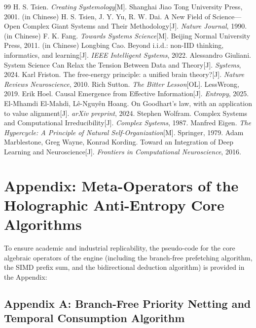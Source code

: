 \documentclass[11pt,a4paper]{article}
\begin{document}
\newpage

\begin{thebibliography}{99}
 H. S. Tsien. \emph{Creating Systemology}[M]. Shanghai Jiao Tong University Press, 2001. (in Chinese)
 H. S. Tsien, J. Y. Yu, R. W. Dai. A New Field of Science—Open Complex Giant Systems and Their Methodology[J]. \emph{Nature Journal}, 1990. (in Chinese)
 F. K. Fang. \emph{Towards Systems Science}[M]. Beijing Normal University Press, 2011. (in Chinese)
 Longbing Cao. Beyond i.i.d.: non-IID thinking, informatics, and learning[J]. \emph{IEEE Intelligent Systems}, 2022.
 Alessandro Giuliani. System Science Can Relax the Tension Between Data and Theory[J]. \emph{Systems}, 2024.
 Karl Friston. The free-energy principle: a unified brain theory?[J]. \emph{Nature Reviews Neuroscience}, 2010.
 Rich Sutton. \emph{The Bitter Lesson}[OL]. LessWrong, 2019.
 Erik Hoel. Causal Emergence from Effective Information[J]. \emph{Entropy}, 2025.
 El-Mhamdi El-Mahdi, L\^e-Nguy\^en Hoang. On Goodhart's law, with an application to value alignment[J]. \emph{arXiv preprint}, 2024.
 Stephen Wolfram. Complex Systems and Computational Irreducibility[J]. \emph{Complex Systems}, 1987.
 Manfred Eigen. \emph{The Hypercycle: A Principle of Natural Self-Organization}[M]. Springer, 1979.
 Adam Marblestone, Greg Wayne, Konrad Kording. Toward an Integration of Deep Learning and Neuroscience[J]. \emph{Frontiers in Computational Neuroscience}, 2016.
\end{thebibliography}

\newpage
\section*{Appendix: Meta-Operators of the Holographic Anti-Entropy Core Algorithms}

To ensure academic and industrial replicability, the pseudo-code for the core algebraic operators of the engine (including the branch-free prefetching algorithm, the SIMD prefix sum, and the bidirectional deduction algorithm) is provided in the Appendix:

\subsection*{Appendix A: Branch-Free Priority Netting and Temporal Consumption Algorithm}
\end{document}
